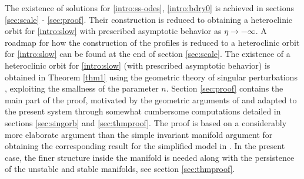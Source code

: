 \documentclass[usletter,11pt]{article}
\theoremstyle{remark}
\begin{document}
The existence of solutions for \eqref{intro:ss-odes}, \eqref{intro:bdry0} is achieved in sections \ref{sec:scale} - \ref{sec:proof}. Their construction is reduced 
to obtaining a heteroclinic orbit for \eqref{intro:slow} with prescribed asymptotic behavior as $\eta \to -\infty$.  
 A roadmap for how the construction of the profiles is reduced to a heteroclinic orbit for \eqref{intro:slow} can be found at the end of section \ref{sec:scale}.
The existence of a heteroclinic  orbit for \eqref{intro:slow} (with prescribed asymptotic behavior) is obtained in Theorem \ref{thm1} using the geometric theory of singular perturbations \cite{fenichel_asymptotic_1974,fenichel_asymptotic_1977,fenichel_geometric_1979,Jones_1995,KUEHN_2015}, exploiting the smallness of the parameter $n$.
Section \ref{sec:proof} contains the main part of the proof, motivated by the geometric arguments of \cite{Sz1991} and adapted to the present system through somewhat cumbersome 
computations detailed in sections \ref{sec:singorb} and \ref{sec:thmproof}. The proof is based on  a considerably more elaborate argument than the simple invariant manifold argument 
for obtaining the corresponding result for the simplified model in \cite{LT16}. 
In the present case, the finer structure inside the manifold is needed along with the persistence of the unstable and stable manifolds, see section \ref{sec:thmproof}.
\end{document}

